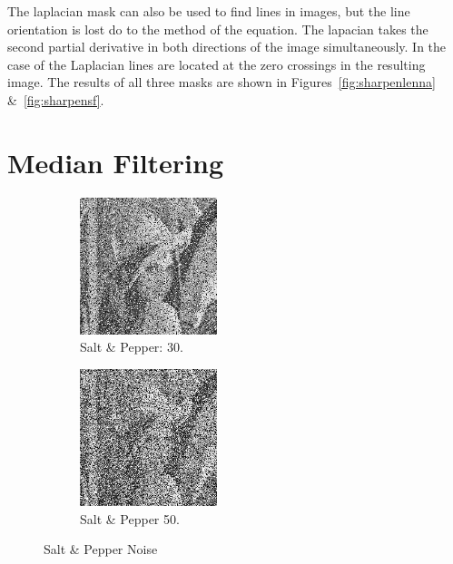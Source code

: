 \documentclass[letterpaper,10pt]{article}
\begin{document}
The laplacian mask can also be used to find lines in images, but the line orientation is lost do to the method of the equation. The lapacian takes the second partial derivative in both directions of the image simultaneously. In the case of the Laplacian lines are located at the zero crossings in the resulting image. The results of all three masks are shown in Figures~\ref{fig:sharpenlenna} \&~\ref{fig:sharpensf}.
\section{Median Filtering}
\begin{figure}[hbtp]
  \centering
  \begin{subfigure}{4cm}
      \includegraphics[width=4cm]{images/salt_lenna_30.png}
      \caption{Salt \& Pepper: 30.}
    \end{subfigure}
     \begin{subfigure}{4cm}
      \includegraphics[width=4cm]{images/salt_lenna_50.png}
      \caption{Salt \& Pepper 50.}
    \end{subfigure}
    \caption{Salt \& Pepper Noise}
\end{figure}
\end{document}
